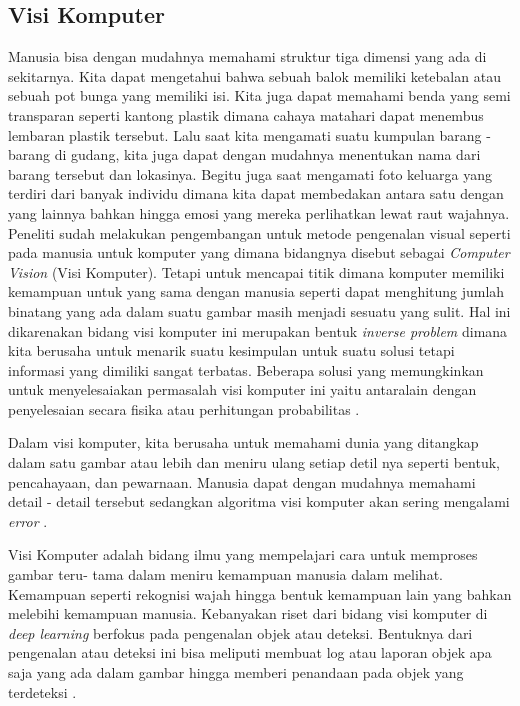 \subsection{Visi Komputer}
\label{sec:visikomputer}

\par Manusia bisa dengan mudahnya memahami struktur tiga dimensi yang ada di sekitarnya. Kita dapat mengetahui bahwa
sebuah balok memiliki ketebalan atau sebuah pot bunga yang memiliki isi. Kita juga dapat memahami benda yang semi transparan
seperti kantong plastik dimana cahaya matahari dapat menembus lembaran plastik tersebut. Lalu saat kita mengamati suatu kumpulan
barang - barang di gudang, kita juga dapat dengan mudahnya menentukan nama dari barang tersebut dan lokasinya. Begitu juga saat
mengamati foto keluarga yang terdiri dari banyak individu dimana kita dapat membedakan antara satu dengan yang lainnya bahkan hingga
emosi yang mereka perlihatkan lewat raut wajahnya. Peneliti sudah melakukan pengembangan untuk metode pengenalan visual seperti pada
manusia untuk komputer yang dimana bidangnya disebut sebagai \emph{Computer Vision} (Visi Komputer). Tetapi untuk mencapai titik dimana
komputer memiliki kemampuan untuk yang sama dengan manusia seperti dapat menghitung jumlah binatang yang ada dalam suatu gambar masih menjadi
sesuatu yang sulit. Hal ini dikarenakan bidang visi komputer ini merupakan bentuk \emph{inverse problem} dimana kita berusaha untuk menarik
suatu kesimpulan untuk suatu solusi tetapi informasi yang dimiliki sangat terbatas. Beberapa solusi yang memungkinkan untuk menyelesaiakan
permasalah visi komputer ini yaitu antaralain dengan penyelesaian secara fisika atau perhitungan probabilitas \cite{szeliski2010computer}.

\par Dalam visi komputer, kita berusaha untuk memahami dunia yang ditangkap dalam satu gambar atau lebih dan meniru ulang setiap detil nya seperti
bentuk, pencahayaan, dan pewarnaan. Manusia dapat dengan mudahnya memahami detail - detail tersebut sedangkan algoritma visi komputer
akan sering mengalami \emph{error} \cite{margaret2008mind}.

\par Visi Komputer adalah bidang ilmu yang mempelajari cara untuk memproses gambar teru- tama dalam meniru
kemampuan manusia dalam melihat. Kemampuan seperti rekognisi wajah hingga bentuk kemampuan lain yang bahkan
melebihi kemampuan manusia. Kebanyakan riset dari bidang visi komputer di \emph{deep learning} berfokus pada
pengenalan objek atau deteksi. Bentuknya dari pengenalan atau deteksi ini bisa meliputi membuat log atau laporan
objek apa saja yang ada dalam gambar hingga memberi penandaan pada objek yang terdeteksi \cite{Goodfellow-et-al-2016}.

